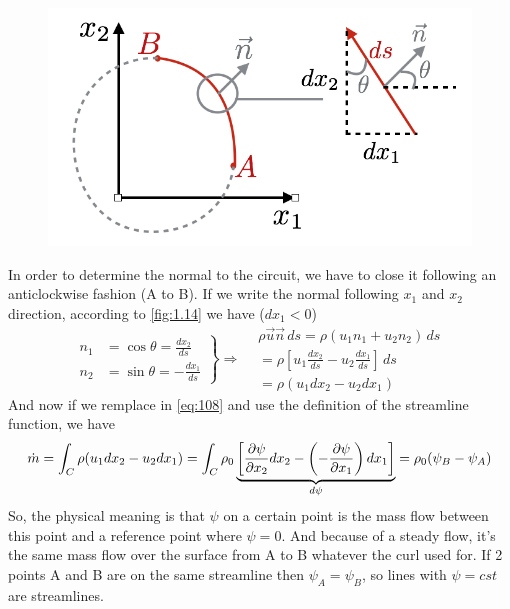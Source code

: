 			\begin{figure}
			\vspace{-5mm}
			\includegraphics[scale=0.4]{ch1/14}
			\label{fig:1.14}
			\end{figure}
			In order to determine the normal to the circuit, we have to close it following an anticlockwise fashion (A to B). If we write the normal following $x_1$ and $x_2$ direction, according to \autoref{fig:1.14} we have ($dx_1<0$)
			\begin{equation}
			\left.
			\begin{aligned}
				n_1 &= \cos \theta = \frac{dx_2}{ds} \\
				n_2 &= \sin \theta = -\frac{dx_1}{ds}
			\end{aligned}
			\right\}
			 \Rightarrow 
			\begin{aligned}
				&\rho \vec{u}\vec{n}\,  ds = \rho (u_1 n_1 + u_2 n_2)\, ds\\
				&= \rho \left[ u_1 \frac{dx_2}{ds} - u_2 \frac{dx_1}{ds} \right]\, ds\\
				&= \rho (u_1 dx_2 - u_2 dx_1)
			\end{aligned}
			\label{eq:1.109}
			\end{equation}
			And now if we remplace in \eqref{eq:108} and use the definition of the streamline function, we have 
			\begin{equation}
				\dot{m} = \int _C \rho (u_1 dx_2 - u_2 dx_1) = \int _C \rho _0 \underbrace{\left[\frac{\partial \psi }{\partial x_2}dx_2 - \left( -\frac{\partial \psi}{\partial x_1} \right) dx_1 \right]}_{d\psi} = \rho _0 (\psi _B - \psi _A)
			\end{equation}
			So, the physical meaning is that $\psi$ on a certain point is the mass flow between this point and a reference point where $\psi = 0$. And because of a steady flow, it's the same mass flow over the surface from A to B whatever the curl used for. If 2 points A and B are on the same streamline then $\psi_A = \psi _B$, so lines with $\psi = cst$ are streamlines. 
			
